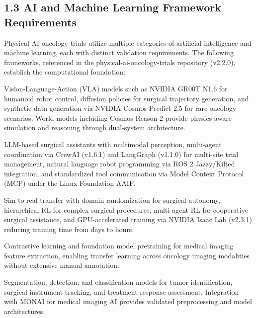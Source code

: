 \documentclass[11pt]{article}
\begin{document}
\subsection{1.3 AI and Machine Learning Framework Requirements}

Physical AI oncology trials utilize multiple categories of artificial intelligence and machine learning, each with distinct validation requirements. The following frameworks, referenced in the physical-ai-oncology-trials repository (v2.2.0), establish the computational foundation:

\begin{description}[leftmargin=2.5cm,style=sameline]

\item[Generative AI] Vision-Language-Action (VLA) models such as NVIDIA GR00T N1.6 for humanoid robot control, diffusion policies for surgical trajectory generation, and synthetic data generation via NVIDIA Cosmos Predict 2.5 for rare oncology scenarios. World models including Cosmos Reason 2 provide physics-aware simulation and reasoning through dual-system architecture.

\item[Agentic AI] LLM-based surgical assistants with multimodal perception, multi-agent coordination via CrewAI (v1.6.1) and LangGraph (v1.1.0) for multi-site trial management, natural language robot programming via ROS 2 Jazzy/Kilted integration, and standardized tool communication via Model Context Protocol (MCP) under the Linux Foundation AAIF.

\item[Reinforcement Learning] Sim-to-real transfer with domain randomization for surgical autonomy, hierarchical RL for complex surgical procedures, multi-agent RL for cooperative surgical assistance, and GPU-accelerated training via NVIDIA Isaac Lab (v2.3.1) reducing training time from days to hours.

\item[Self-Supervised Learning] Contrastive learning and foundation model pretraining for medical imaging feature extraction, enabling transfer learning across oncology imaging modalities without extensive manual annotation.

\item[Supervised Learning] Segmentation, detection, and classification models for tumor identification, surgical instrument tracking, and treatment response assessment. Integration with MONAI for medical imaging AI provides validated preprocessing and model architectures.

\end{description}
\end{document}
